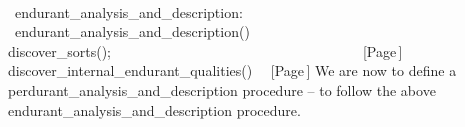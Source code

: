 \label{endurantanalysisanddescription}
\bp
{}\\
\>\ endurant\_analysis\_and\_description:  {\RIGHTARROW} \\
\>\ endurant\_analysis\_and\_description() {\IS} \\
\>\>\>discover\_sorts();\ \ \ \ \ \ \ \ \ \ \ \ \ \ \ \ \ \ \ \ \ \ \ \ \ \ \ \ \ \ \ \ \ \ \ \ [Page\,\pageref{discover-sorts}]\\
\>\>\>discover\_internal\_endurant\_qualities()  \ \ [Page\,\pageref{discover-uids}]
\ep
\noindent
\begynd
\pind We are now to define a
      \textsf{perdurant\_analysis\_and\_description}
      procedure -- 
\pind to follow the above \textsf{endurant\_an\-a\-ly\-sis\_\-and\_\-des\-crip\-tion}
      procedure.
\afslut
 
%
      \label{A Domain Discovery Process, III}

